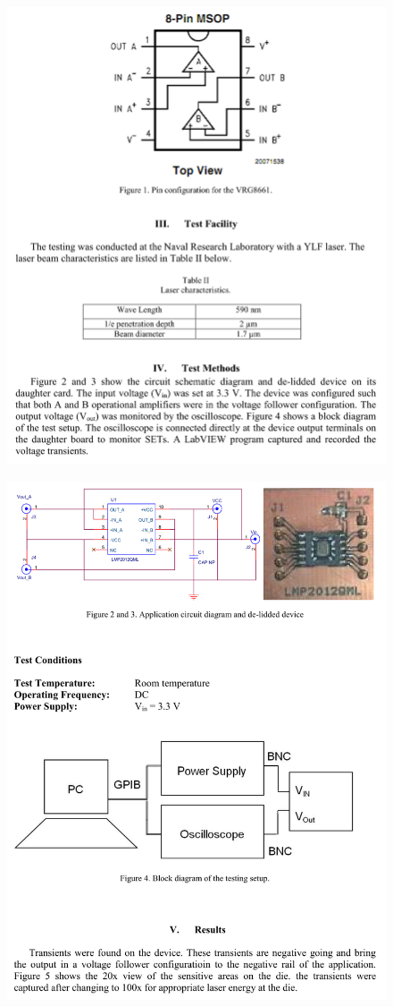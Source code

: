 \documentclass[
	12pt,				%
	openright,			%
	oneside,			%
	a4paper,			%
	english,			%
	french,				%
	spanish,			%
	brazil,				%
	oldfontcommands
	]{abntex2}
\begin{document}
\begin{anexosenv}
	\begin{figure}[th]
		\centering
		\includegraphics[width=0.85\linewidth]{./anexos/lmp2012_2}	
	\end{figure}	
	
	\begin{figure}[th]
		\centering
		\includegraphics[width=0.85\linewidth]{./anexos/lmp2012_3}	
	\end{figure}	
	

\end{anexosenv}
\end{document}
